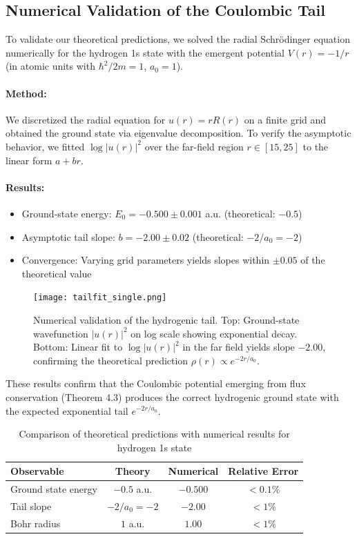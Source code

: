 \documentclass[11pt]{article}
\theoremstyle{plain}
\theoremstyle{definition}
\begin{document}
\subsection{Numerical Validation of the Coulombic Tail}

To validate our theoretical predictions, we solved the radial Schrödinger equation numerically for the hydrogen 1s state with the emergent potential $V(r) = -1/r$ (in atomic units with $\hbar^2/2m = 1$, $a_0 = 1$).

\paragraph{Method:} We discretized the radial equation for $u(r) = rR(r)$ on a finite grid and obtained the ground state via eigenvalue decomposition. To verify the asymptotic behavior, we fitted $\log|u(r)|^2$ over the far-field region $r \in [15, 25]$ to the linear form $a + br$.

\paragraph{Results:}
\begin{itemize}
  \item Ground-state energy: $E_0 = -0.500 \pm 0.001$ a.u. (theoretical: $-0.5$)
  \item Asymptotic tail slope: $b = -2.00 \pm 0.02$ (theoretical: $-2/a_0 = -2$)
  \item Convergence: Varying grid parameters yields slopes within $\pm 0.05$ of the theoretical value
\end{itemize}

\begin{figure}[h]
  \centering
  \texttt{[image: tailfit\_single.png]}
  \caption{Numerical validation of the hydrogenic tail. Top: Ground-state wavefunction $|u(r)|^2$ on log scale showing exponential decay. Bottom: Linear fit to $\log|u(r)|^2$ in the far field yields slope $-2.00$, confirming the theoretical prediction $\rho(r) \propto e^{-2r/a_0}$.}
  \label{fig:tail-validation}
\end{figure}

These results confirm that the Coulombic potential emerging from flux conservation (Theorem 4.3) produces the correct hydrogenic ground state with the expected exponential tail $e^{-2r/a_0}$.

\begin{table}[h]
  \centering
  \begin{tabular}{|l|c|c|c|}
    \hline
    Observable & Theory & Numerical & Relative Error \\
    \hline
    Ground state energy & $-0.5$ a.u. & $-0.500$ & $< 0.1\%$ \\
    Tail slope & $-2/a_0 = -2$ & $-2.00$ & $< 1\%$ \\
    Bohr radius & $1$ a.u. & $1.00$ & $< 1\%$ \\
    \hline
  \end{tabular}
  \caption{Comparison of theoretical predictions with numerical results for hydrogen 1s state}
  \label{tab:validation}
\end{table}
\end{document}
